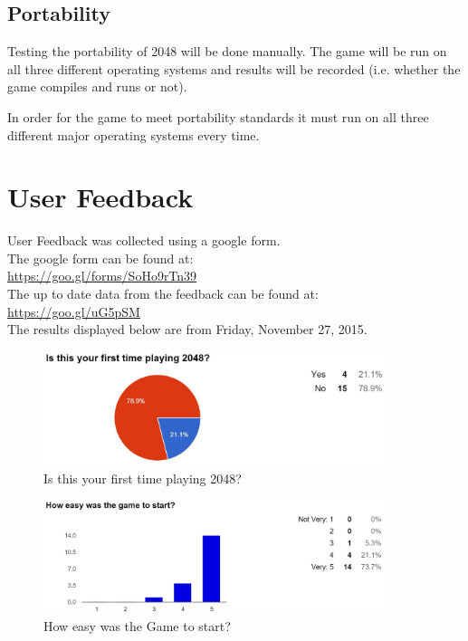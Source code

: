 \documentclass[12pt]{article}
\begin{document}
\subsection{Portability}

Testing the portability of 2048 will be done manually. The game will be run on all three different operating systems and results will be recorded (i.e. whether the game compiles and runs or not).
\par In order for the game to meet portability standards it must run on all three different major operating systems every time.

\section{User Feedback}
User Feedback was collected using a google form. \\
The google form can be found at: \\ \url{https://goo.gl/forms/SoHo9rTn39} \\
The up to date data from the feedback can be found at:\\ \url{https://goo.gl/uG5pSM} \\
The results displayed below are from Friday, November 27, 2015.

\begin{figure}[H]
	\centering
	\includegraphics[width = 10cm]{Before}
	\caption{Is this your first time playing 2048?}
	\label{Is this your first time playing 2048?}
\end{figure}

\begin{figure}[H]
	\centering
	\includegraphics[width = 10cm]{Easy_Start}
	\caption{How easy was the Game to start?}
	\label{How easy was the Game to start?}
\end{figure}
\end{document}
